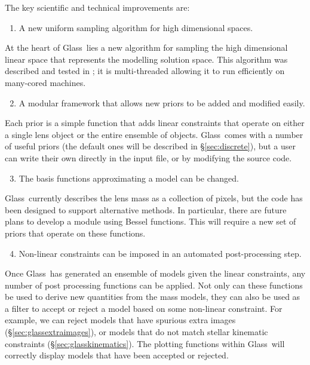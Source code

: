 \documentclass[galley,usenatbib]{mn2e}
\newcommand{\Glass}{{\sc Glass}}
\newcommand{\secref}[1] {\S\ref{#1}}
\begin{document}
The key scientific and technical improvements are:
%
\begin{enumerate}
  \setcounter{enumi}{0}
  \item A new uniform sampling algorithm for high dimensional spaces.
\end{enumerate}
%
At the heart of \Glass\ lies a new algorithm for sampling the high dimensional
linear space that represents the modelling solution space. This algorithm was
described and tested in \cite{2012MNRAS.425.3077L}; it is multi-threaded
allowing it to run efficiently on many-cored machines.
%
\begin{enumerate}
  \setcounter{enumi}{1}
  \item A modular framework that allows new priors to be added and modified easily.
\end{enumerate}
%
Each prior is a simple function that adds linear constraints that operate on
either a single lens object or the entire ensemble of objects. \Glass\ comes
with a number of useful priors (the default ones will be described in \secref{sec:discrete}), but a
user can write their own directly in the input file, or by modifying the source
code.
%
\begin{enumerate}
  \setcounter{enumi}{2}
  \item The basis functions approximating a model can be changed. 
\end{enumerate}
%
\Glass\ currently describes the lens mass as a collection of pixels, but the
code has been designed to support alternative methods. In particular, there are
future plans to develop a module using Bessel functions. This will require a
new set of priors that operate on these functions.
%
\begin{enumerate}
  \setcounter{enumi}{3}
  \item Non-linear constraints can be imposed in an automated post-processing step. 
\end{enumerate}
%
Once \Glass\ has generated an ensemble of models given the linear constraints,
any number of post processing functions can be applied. Not only can these
functions be used to derive new quantities from the mass models, they can also
be used as a filter to accept or reject a model based on some non-linear
constraint. For example, we can reject models that have spurious extra images (\secref{sec:glassextraimages}), or models that do not match stellar kinematic constraints (\secref{sec:glasskinematics}). The plotting functions within \Glass\ will correctly display models
that have been accepted or rejected.
\end{document}

